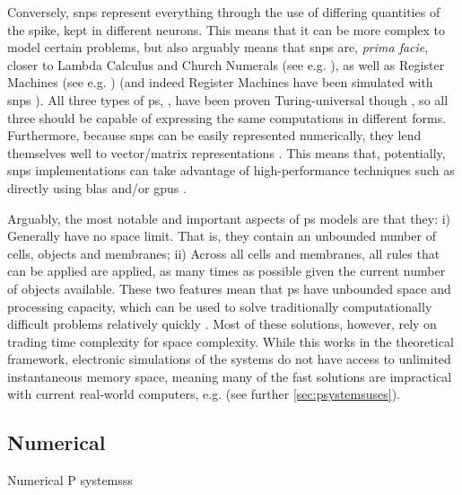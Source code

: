 Conversely, \gls{snps} represent everything through the use of differing quantities of the spike, kept in different neurons.  This means that it can be more complex to model certain problems, but also arguably means that \gls{snps} are, \textit{prima facie}, closer to Lambda Calculus \cite{Barendregt1984} and Church Numerals (see e.g. \cite{Koopman2014,Hinze2005}), as well as Register Machines (see e.g. \cite{Korec1996}) (and indeed Register Machines have been simulated with \gls{snps} \cite{Pan2010}).  All three types of \gls{ps}, , have been proven Turing-universal though \cite{Bernardini2005,Chen2008,Freund2005}, so all three should be capable of expressing the same computations in different forms.  Furthermore, because \gls{snps} can be easily represented numerically, they lend themselves well to vector/matrix representations \cite{Zeng2010,Martinez-del-Amor2021,Gheorghe2021,Hu2016}.  This means that, potentially, \gls{snps} implementations can take advantage of high-performance techniques such as directly using \gls{blas} and/or \glspl{gpu} \cite{Aboy2019}.

Arguably, the most notable and important aspects of \gls{ps} models are that they:  i) Generally have no space limit.  That is, they contain an unbounded number of cells, objects and membranes;  ii) Across all cells and membranes, all rules that can be applied are applied, as many times as possible given the current number of objects available.  These two features mean that \gls{ps} have unbounded space and processing capacity, which can be used to solve traditionally computationally difficult problems relatively quickly \cite{Sosik2003,Jimenez2003,Paun1999a,Henderson2020}.  Most of these solutions, however, rely on trading time complexity for space complexity.  While this works in the theoretical framework, electronic simulations of the systems do not have access to unlimited instantaneous memory space, meaning many of the fast solutions are impractical with current real-world computers, e.g. \cite{Cooper2019,Cooper2019a} \fxnote[inline]{[refs]} (see further \autoref{sec:psystemsuses}).

\subsection{\label{subsec:numpsys}Numerical }
Numerical P systemsss

